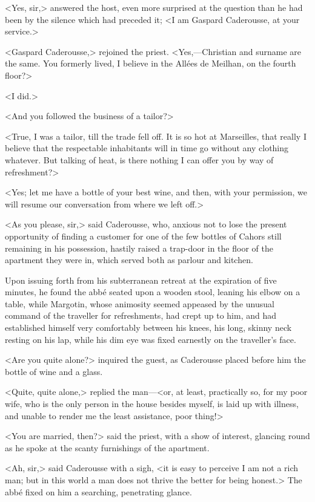  <Yes, sir,> answered the host, even more surprised at the question than he had been by the silence which had preceded it; <I am Gaspard Caderousse, at your service.> 

 <Gaspard Caderousse,> rejoined the priest. <Yes,—Christian and surname are the same. You formerly lived, I believe in the Allées de Meilhan, on the fourth floor?>

<I did.> 

 <And you followed the business of a tailor?> 

 <True, I was a tailor, till the trade fell off. It is so hot at Marseilles, that really I believe that the respectable inhabitants will in time go without any clothing whatever. But talking of heat, is there nothing I can offer you by way of refreshment?> 

 <Yes; let me have a bottle of your best wine, and then, with your permission, we will resume our conversation from where we left off.> 

 <As you please, sir,> said Caderousse, who, anxious not to lose the present opportunity of finding a customer for one of the few bottles of Cahors still remaining in his possession, hastily raised a trap-door in the floor of the apartment they were in, which served both as parlour and kitchen. 

 Upon issuing forth from his subterranean retreat at the expiration of five minutes, he found the abbé seated upon a wooden stool, leaning his elbow on a table, while Margotin, whose animosity seemed appeased by the unusual command of the traveller for refreshments, had crept up to him, and had established himself very comfortably between his knees, his long, skinny neck resting on his lap, while his dim eye was fixed earnestly on the traveller's face. 

 <Are you quite alone?> inquired the guest, as Caderousse placed before him the bottle of wine and a glass. 

 <Quite, quite alone,> replied the man—<or, at least, practically so, for my poor wife, who is the only person in the house besides myself, is laid up with illness, and unable to render me the least assistance, poor thing!> 

 <You are married, then?> said the priest, with a show of interest, glancing round as he spoke at the scanty furnishings of the apartment. 

 <Ah, sir,> said Caderousse with a sigh, <it is easy to perceive I am not a rich man; but in this world a man does not thrive the better for being honest.> The abbé fixed on him a searching, penetrating glance. 


